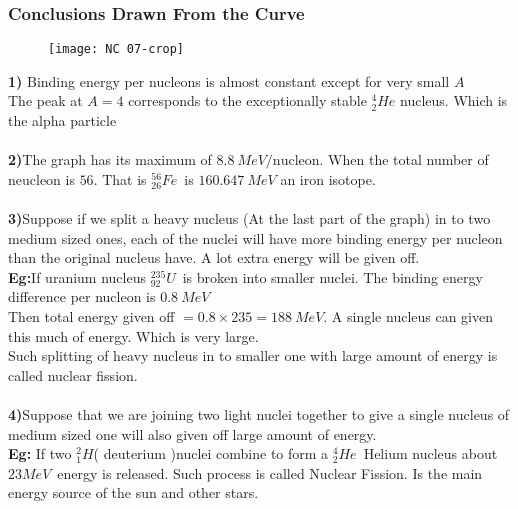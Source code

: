 \subsubsection{Conclusions Drawn From the Curve}
\begin{figure}[H]
	\centering
	\texttt{[image: NC 07-crop]}
	\caption{}
	\label{}
\end{figure}
\textbf{1)} \quad Binding energy per nucleons is almost constant except for very small $A$\\
The peak at $A=4$ corresponds to the exceptionally stable $^4_2He$ nucleus. Which is the alpha particle \\\\
\textbf{2)}\quad The graph has its maximum of $8.8\ MeV/\text{nucleon}$. When the total number of neucleon is $56$. That is $^{56}_{26}Fe$\ is $160.647\ MeV$ an iron isotope.\\\\
\textbf{3)}Suppose if we split a heavy nucleus (At the last part of the graph) in to two medium sized ones, each of the nuclei will have more binding energy per nucleon than the original nucleus have. A lot extra energy will be given off.\\
\textbf{Eg:}\quad If uranium nucleus $^{235}_{92}U$\ is broken into smaller nuclei. The binding energy difference per nucleon is $0.8\ MeV$\\
Then total energy given off $=0.8\times235=188\ MeV$. A single nucleus can given this much of energy. Which is very large.\\
Such splitting of heavy nucleus in to smaller one with large amount of energy is called nuclear fission.\\\\
\textbf{4)}\quad Suppose that we are joining two light nuclei together to give a single nucleus of medium sized one will also given off large amount of energy.\\
\textbf{Eg:} \quad If two $^2_1H$( deuterium )nuclei combine to form a  $^4_2He$\ Helium nucleus about $23MeV$\ energy is released. Such process is called Nuclear Fission. Is the main energy source of the sun and other stars.

